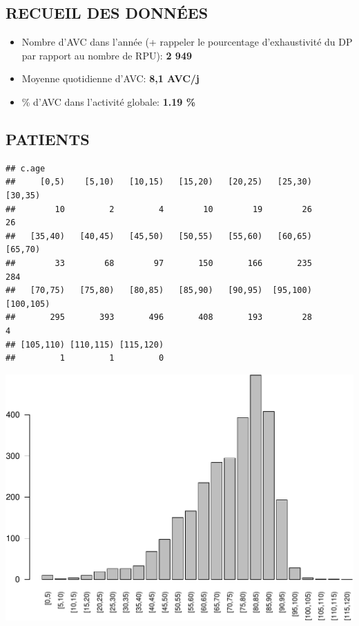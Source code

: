 \documentclass[]{article}
\begin{document}
\subsection{RECUEIL DES DONNÉES}\label{recueil-des-donnees-3}

\begin{itemize}
\itemsep1pt\parskip0pt
\item
  Nombre d'AVC dans l'année (+ rappeler le pourcentage d'exhaustivité du
  DP par rapport au nombre de RPU): \textbf{2 949}
\item
  Moyenne quotidienne d'AVC: \textbf{8,1 AVC/j}
\item
  \% d'AVC dans l'activité globale: \textbf{1.19 \%}
\end{itemize}

\subsection{PATIENTS}\label{patients-3}

\begin{verbatim}
## c.age
##     [0,5)    [5,10)   [10,15)   [15,20)   [20,25)   [25,30)   [30,35) 
##        10         2         4        10        19        26        26 
##   [35,40)   [40,45)   [45,50)   [50,55)   [55,60)   [60,65)   [65,70) 
##        33        68        97       150       166       235       284 
##   [70,75)   [75,80)   [80,85)   [85,90)   [90,95)  [95,100) [100,105) 
##       295       393       496       408       193        28         4 
## [105,110) [110,115) [115,120) 
##         1         1         0
\end{verbatim}

\includegraphics{rapport2014_V4_files/figure-latex/patients-1.pdf}
\end{document}
